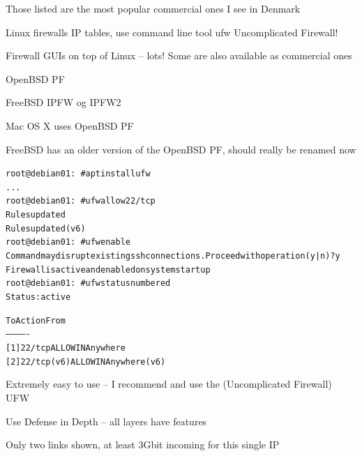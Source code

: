 \documentclass[Screen16to9,17pt]{foils}
\begin{document}
Those listed are the most popular commercial ones I see in Denmark


\begin{list2}
\item Linux firewalls IP tables, use command line tool ufw Uncomplicated Firewall!
\item Firewall GUIs on top of Linux -- lots! Some are also available as commercial ones
\item OpenBSD PF
\item FreeBSD IPFW og IPFW2 
\item Mac OS X uses OpenBSD PF
\item FreeBSD has an older version of the OpenBSD PF, should really be renamed now
\end{list2}




\begin{alltt}\small
root@debian01:~# apt install ufw
...
root@debian01:~# ufw allow 22/tcp
Rules updated
Rules updated (v6)
root@debian01:~# ufw enable
Command may disrupt existing ssh connections. Proceed with operation (y|n)? y
Firewall is active and enabled on system startup
root@debian01:~# ufw status numbered
Status: active

     To                         Action      From
     --                         ------      ----
[ 1] 22/tcp                     ALLOW IN    Anywhere
[ 2] 22/tcp (v6)                ALLOW IN    Anywhere (v6)
\end{alltt}

\begin{list2}
\item Extremely easy to use -- I recommend and use the (Uncomplicated Firewall) UFW
\end{list2}





\centerline{Use Defense in Depth -- all layers have features}




\centerline{Only two links shown, at least 3Gbit incoming for this single IP}
\end{document}
